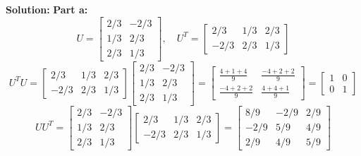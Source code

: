 \documentclass[11pt, letterpaper]{article}
\theoremstyle{definition}
\theoremstyle{remark}
\begin{document}
\textbf{Solution:}
\textbf{Part a:}
\[ U = \begin{bmatrix} 2/3 & -2/3 \\ 1/3 & 2/3 \\ 2/3 & 1/3 \end{bmatrix}, \quad U^T = \begin{bmatrix} 2/3 & 1/3 & 2/3 \\ -2/3 & 2/3 & 1/3 \end{bmatrix} \]
\[ U^T U = \begin{bmatrix} 2/3 & 1/3 & 2/3 \\ -2/3 & 2/3 & 1/3 \end{bmatrix} \begin{bmatrix} 2/3 & -2/3 \\ 1/3 & 2/3 \\ 2/3 & 1/3 \end{bmatrix} = \begin{bmatrix} \frac{4+1+4}{9} & \frac{-4+2+2}{9} \\ \frac{-4+2+2}{9} & \frac{4+4+1}{9} \end{bmatrix} = \begin{bmatrix} 1 & 0 \\ 0 & 1 \end{bmatrix} \]
\[ U U^T = \begin{bmatrix} 2/3 & -2/3 \\ 1/3 & 2/3 \\ 2/3 & 1/3 \end{bmatrix} \begin{bmatrix} 2/3 & 1/3 & 2/3 \\ -2/3 & 2/3 & 1/3 \end{bmatrix} = \begin{bmatrix} 8/9 & -2/9 & 2/9 \\ -2/9 & 5/9 & 4/9 \\ 2/9 & 4/9 & 5/9 \end{bmatrix} \]
\end{document}
